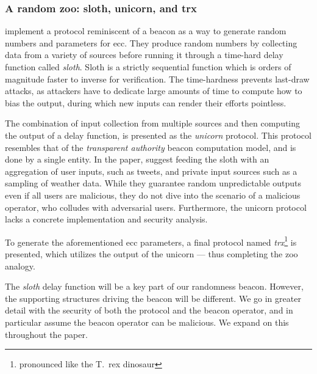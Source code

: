 \subsubsection{A random zoo: sloth, unicorn, and trx}%
\label{sub:random_zoo}
\citet{randomzoo} implement a protocol reminiscent of a beacon as a way to generate random numbers and parameters for \gls{ecc}.
They produce random numbers by collecting data from a variety of sources before running it through a time-hard delay function called \textit{sloth}.
Sloth is a strictly sequential function which is orders of magnitude faster to inverse for verification.
The time-hardness prevents last-draw attacks, as attackers have to dedicate large amounts of time to compute how to bias the output, during which new inputs can render their efforts pointless.

The combination of input collection from multiple sources and then computing the output of a delay function, is presented as the \textit{unicorn} protocol.
This protocol resembles that of the \emph{transparent authority} beacon computation model, and is done by a single entity.
In the paper, \citeauthor{randomzoo} suggest feeding the sloth with an aggregation of user inputs, such as tweets, and private input sources such as a sampling of weather data.
While they guarantee random unpredictable outputs even if all users are malicious, they do not dive into the scenario of a malicious operator, who colludes with adversarial users.
Furthermore, the unicorn protocol lacks a concrete implementation and security analysis.

To generate the aforementioned \gls{ecc} parameters, a final protocol named \textit{trx}\footnote{pronounced like the T.\ rex dinosaur} is presented, which utilizes the output of the unicorn --- thus completing the zoo analogy.

The \emph{sloth} delay function will be a key part of our randomness beacon. However, the supporting structures driving the beacon will be different.
We go in greater detail with the security of both the protocol and the beacon operator, and in particular assume the beacon operator can be malicious.
We expand on this throughout the paper.
